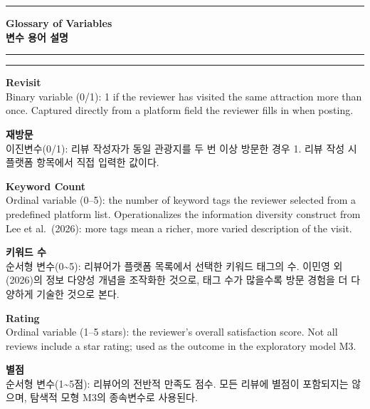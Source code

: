 \documentclass[10pt,a4paper]{article}
\begin{document}
\vspace{4pt}
\noindent\rule{\linewidth}{0.8pt}

\clearpage

\begin{center}
  {\large\bfseries Glossary of Variables}\\[2pt]
  {\large\bfseries 변수 용어 설명}
\end{center}
\rule{\linewidth}{0.8pt}\vspace{4pt}

\newcommand{\gterm}[4]{%
  \noindent%
  \begin{minipage}[t]{0.485\linewidth}
    \small\textbf{#1}\\[2pt] #2
  \end{minipage}\hfill\vrule\hfill%
  \begin{minipage}[t]{0.483\linewidth}
    \small\textbf{#3}\\[2pt] #4
  \end{minipage}\par\vspace{8pt}%
}

\par
\vspace{2pt}\rule{\linewidth}{0.3pt}\vspace{4pt}

\gterm{Revisit}{%
Binary variable (0/1): 1 if the reviewer has visited the same attraction more than once. Captured directly from a platform field the reviewer fills in when posting.
}{재방문}{%
이진변수(0/1): 리뷰 작성자가 동일 관광지를 두 번 이상 방문한 경우 1. 리뷰 작성 시 플랫폼 항목에서 직접 입력한 값이다.
}

\gterm{Keyword Count}{%
Ordinal variable (0--5): the number of keyword tags the reviewer selected from a predefined platform list. Operationalizes the information diversity construct from Lee et al.\ (2026): more tags mean a richer, more varied description of the visit.
}{키워드 수}{%
순서형 변수(0\textasciitilde5): 리뷰어가 플랫폼 목록에서 선택한 키워드 태그의 수. 이민영 외(2026)의 정보 다양성 개념을 조작화한 것으로, 태그 수가 많을수록 방문 경험을 더 다양하게 기술한 것으로 본다.
}

\gterm{Rating}{%
Ordinal variable (1--5 stars): the reviewer's overall satisfaction score. Not all reviews include a star rating; used as the outcome in the exploratory model M3.
}{별점}{%
순서형 변수(1\textasciitilde5점): 리뷰어의 전반적 만족도 점수. 모든 리뷰에 별점이 포함되지는 않으며, 탐색적 모형 M3의 종속변수로 사용된다.
}
\end{document}
